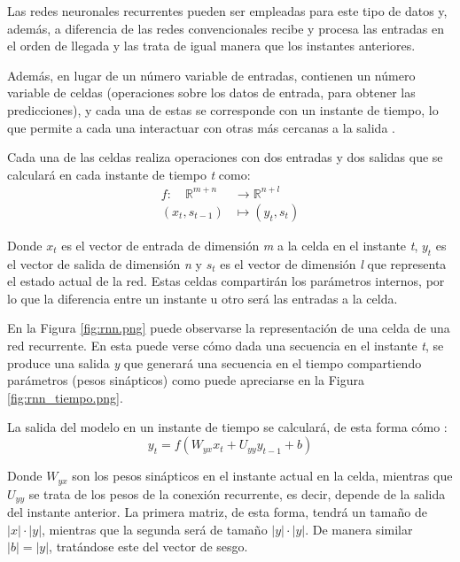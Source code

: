 Las redes neuronales recurrentes pueden ser empleadas para este tipo de datos y, además, a diferencia de las redes convencionales recibe y procesa las 
entradas en el orden de llegada y las trata de igual manera que los instantes anteriores.

Además, en lugar de un número variable de entradas, contienen un número variable de celdas (operaciones sobre los datos de entrada, 
para obtener las predicciones), y cada una de estas se corresponde con un 
instante de tiempo, lo que permite a cada una interactuar con otras más cercanas a la salida \cite{book:aggarwal2018}.

Cada una de las celdas realiza operaciones con dos entradas y dos salidas que se calculará en cada instante de tiempo \textit{t} como:
\begin{equation}
    \begin{aligned}
    f: \quad \mathbb{R}^{m+n} & \rightarrow \mathbb{R}^{n+l} \\
    \left(x_t, s_{t-1}\right) & \mapsto\left(y_t, s_t\right)
    \end{aligned}
\end{equation}

Donde \(x_t\) es el vector de entrada de dimensión \textit{m} a la celda en el instante \textit{t}, \(y_{t}\) es el vector de salida de 
dimensión \textit{n} y \(s_{t}\) es el vector de dimensión \textit{l} que representa el estado actual de la red.
Estas celdas compartirán los parámetros internos, por lo que la diferencia entre un instante u otro será las entradas a la celda.


En la Figura \ref{fig:rnn.png} puede observarse la representación de una celda de una red recurrente. En
esta puede verse cómo dada una secuencia en el instante \textit{t}, se produce una salida 
\textit{y} que generará una secuencia en el tiempo compartiendo parámetros (pesos sinápticos) como puede apreciarse
en la Figura \ref{fig:rnn_tiempo.png}.


La salida del modelo en un instante de tiempo se calculará, de esta forma cómo \cite{book:rue2019}:
\begin{equation}
    y_t = f(W_{yx}x_t + U_{yy} y_{t-1} + b) 
\end{equation}

Donde \(W_{yx}\) son los pesos sinápticos en el instante actual en la celda, mientras que \(U_{yy}\) se
trata de los pesos de la conexión recurrente, es decir, depende de la salida del instante anterior.
La primera matriz, de esta forma, tendrá un tamaño de \(|x| \cdot |y|\), mientras que la segunda
será de tamaño \(|y| \cdot  |y|\). De manera similar \(|b| = |y|\), tratándose este del vector de sesgo.


